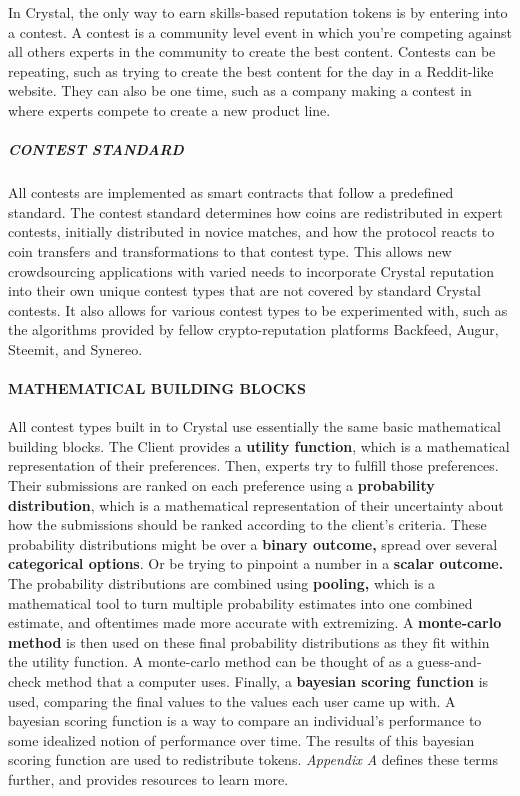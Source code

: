 In Crystal, the only way to earn skills-based reputation tokens is by
entering into a contest. A contest is a community level event in which
you're competing against all others experts in the community to create
the best content. Contests can be repeating, such as trying to create
the best content for the day in a Reddit-like website. They can also be
one time, such as a company making a contest in where experts compete to
create a new product line.

\subparagraph{CONTEST STANDARD}\label{contest-standard}

All contests are implemented as smart contracts that follow a predefined
standard. The contest standard determines how coins are redistributed in
expert contests, initially distributed in novice matches, and how the
protocol reacts to coin transfers and transformations to that contest
type. This allows new crowdsourcing applications with varied needs to
incorporate Crystal reputation into their own unique contest types that
are not covered by standard Crystal contests. It also allows for various
contest types to be experimented with, such as the algorithms provided
by fellow crypto-reputation platforms Backfeed, Augur, Steemit, and
Synereo.

\paragraph{MATHEMATICAL BUILDING BLOCKS
}\label{mathematical-building-blocks}

All contest types built in to Crystal use essentially the same basic
mathematical building blocks. The Client provides a \textbf{utility
function}, which is a mathematical representation of their preferences.
Then, experts try to fulfill those preferences. Their submissions are
ranked on each preference using a \textbf{probability distribution},
which is a mathematical representation of their uncertainty about how
the submissions should be ranked according to the client's criteria.
These probability distributions might be over a \textbf{binary outcome,}
spread over several \textbf{categorical options}. Or be trying to
pinpoint a number in a \textbf{scalar outcome.} The probability
distributions are combined using \textbf{pooling,} which is a
mathematical tool to turn multiple probability estimates into one
combined estimate, and oftentimes made more accurate with extremizing. A
\textbf{monte-carlo method} is then used on these final probability
distributions as they fit within the utility function. A monte-carlo
method can be thought of as a guess-and-check method that a computer
uses. Finally, a \textbf{bayesian scoring function} is used, comparing
the final values to the values each user came up with. A bayesian
scoring function is a way to compare an individual's performance to some
idealized notion of performance over time. The results of this bayesian
scoring function are used to redistribute tokens. \emph{Appendix A}
defines these terms further, and provides resources to learn more.

